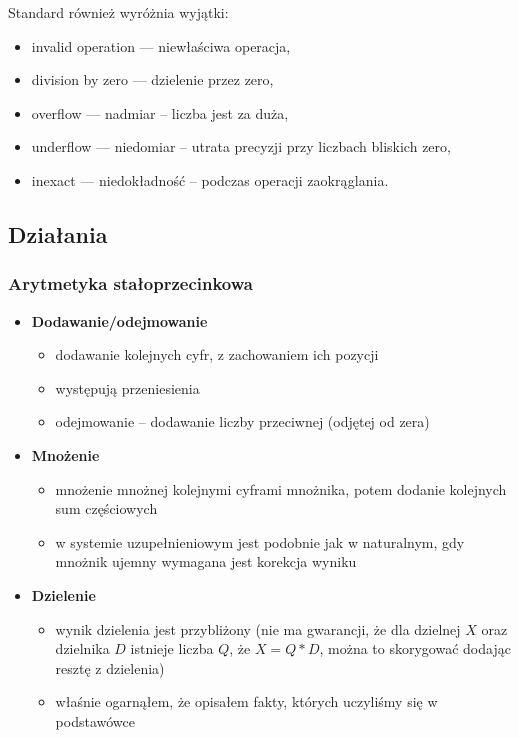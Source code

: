 Standard również wyróżnia wyjątki:
\begin{itemize}
\item invalid operation --- niewłaściwa operacja,
\item division by zero --- dzielenie przez zero,
\item overflow --- nadmiar -- liczba jest za duża,
\item underflow --- niedomiar -- utrata precyzji przy liczbach bliskich zero,
\item inexact --- niedokładność -- podczas operacji zaokrąglania.
\end{itemize}

\subsection{Działania}
\subsubsection{Arytmetyka stałoprzecinkowa}
\begin{itemize}
\item \textbf{Dodawanie/odejmowanie}
	\begin{itemize}
	\item dodawanie kolejnych cyfr, z zachowaniem ich pozycji
	\item występują przeniesienia
	\item odejmowanie -- dodawanie liczby przeciwnej (odjętej od zera)
	\end{itemize}
\item \textbf{Mnożenie}
	\begin{itemize}
	\item mnożenie mnożnej kolejnymi cyframi mnożnika, potem dodanie kolejnych sum częściowych
	\item w systemie uzupełnieniowym jest podobnie jak w naturalnym, gdy mnożnik ujemny wymagana jest korekcja wyniku
	\end{itemize}
\item \textbf{Dzielenie}
	\begin{itemize}
	\item wynik dzielenia jest przybliżony (nie ma gwarancji, że dla dzielnej $X$ oraz dzielnika $D$ istnieje liczba $Q$, że $X = Q * D$, można to skorygować dodając resztę z dzielenia)
	\item właśnie ogarnąłem, że opisałem fakty, których uczyliśmy się w podstawówce
	\end{itemize}
\end{itemize}

